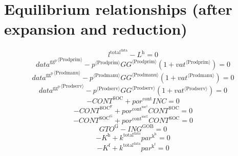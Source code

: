 \section{Equilibrium relationships (after expansion and reduction)}

\begin{equation}
l^{\mathrm{total}^{\mathrm{data}}} - L^{\mathrm{h}} = 0
\end{equation}
\begin{equation}
{{d\!a\!t\!a}^{\mathrm{gg}^{\mathrm{p}}}}^{\langle \mathrm{\mathrm{Prodprim}}\rangle} - {{p}^{\langle \mathrm{Prodprim}\rangle}} {{{G\!G}}^{\langle \mathrm{Prodprim}\rangle}} \left(1 + {{v\!a\!t}}^{\langle \mathrm{\mathrm{Prodprim}}\rangle}\right) = 0
\end{equation}
\begin{equation}
{{d\!a\!t\!a}^{\mathrm{gg}^{\mathrm{p}}}}^{\langle \mathrm{\mathrm{Prodmanu}}\rangle} - {{p}^{\langle \mathrm{Prodmanu}\rangle}} {{{G\!G}}^{\langle \mathrm{Prodmanu}\rangle}} \left(1 + {{v\!a\!t}}^{\langle \mathrm{\mathrm{Prodmanu}}\rangle}\right) = 0
\end{equation}
\begin{equation}
{{d\!a\!t\!a}^{\mathrm{gg}^{\mathrm{p}}}}^{\langle \mathrm{\mathrm{Prodserv}}\rangle} - {{p}^{\langle \mathrm{Prodserv}\rangle}} {{{G\!G}}^{\langle \mathrm{Prodserv}\rangle}} \left(1 + {{v\!a\!t}}^{\langle \mathrm{\mathrm{Prodserv}}\rangle}\right) = 0
\end{equation}
\begin{equation}
-{C\!O\!N\!T}^{\mathrm{SOC}} + {{p\!o\!r}^{\mathrm{cont}}} {{I\!N\!C}} = 0
\end{equation}
\begin{equation}
-{C\!O\!N\!T}^{\mathrm{SOC}^{\mathrm{F}}} + {{p\!o\!r}^{\mathrm{cont}^{\mathrm{soc}^{\mathrm{f}}}}} {{C\!O\!N\!T}^{\mathrm{SOC}}} = 0
\end{equation}
\begin{equation}
-{C\!O\!N\!T}^{\mathrm{SOC}^{\mathrm{G}}} + {{p\!o\!r}^{\mathrm{cont}^{\mathrm{soc}^{\mathrm{g}}}}} {{C\!O\!N\!T}^{\mathrm{SOC}}} = 0
\end{equation}
\begin{equation}
{G\!T\!O}^{\mathrm{G}} - {I\!N\!G}^{\mathrm{GOB}} = 0
\end{equation}
\begin{equation}
-K^{\mathrm{h}} + {k^{\mathrm{total}^{\mathrm{data}}}} {{p\!a\!r}^{\mathrm{k}^{\mathrm{h}}}} = 0
\end{equation}
\begin{equation}
-K^{\mathrm{f}} + {k^{\mathrm{total}^{\mathrm{data}}}} {{p\!a\!r}^{\mathrm{k}^{\mathrm{f}}}} = 0
\end{equation}
